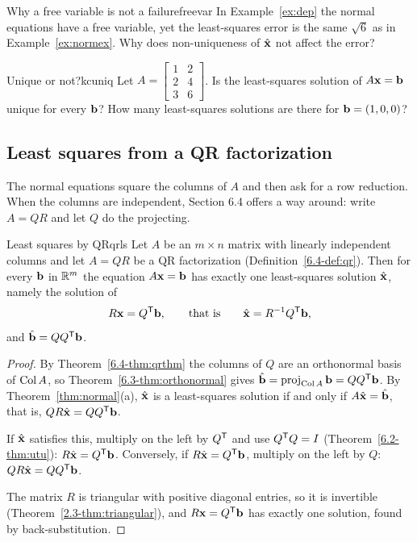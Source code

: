 \documentclass[11pt]{article}
\begin{document}
\begin{think}{Why a free variable is not a failure}{freevar}
In Example~\ref{ex:dep} the normal equations have a free variable, yet the least-squares error is the same $\sqrt6$ as in Example~\ref{ex:normex}. Why does non-uniqueness of $\hat{\mathbf{x}}$ not affect the error?
\end{think}

\begin{kc}{Unique or not?}{kcuniq}
Let $A=\begin{bmatrix}1&2\\2&4\\3&6\end{bmatrix}$. Is the least-squares solution of $A\mathbf{x}=\mathbf{b}$ unique for every $\mathbf{b}$? How many least-squares solutions are there for $\mathbf{b}=(1,0,0)$?
\end{kc}

\subsection*{Least squares from a QR factorization}

The normal equations square the columns of $A$ and then ask for a row reduction. When the columns are independent, Section 6.4 offers a way around: write $A=QR$ and let $Q$ do the projecting.

\begin{thm}{Least squares by QR}{qrls}
Let $A$ be an $m\times n$ matrix with linearly independent columns and let $A=QR$ be a QR factorization (Definition~\ref{6.4-def:qr}). Then for every $\mathbf{b}$ in $\mathbb{R}^m$ the equation $A\mathbf{x}=\mathbf{b}$ has exactly one least-squares solution $\hat{\mathbf{x}}$, namely the solution of
\[
R\mathbf{x}=Q^{\mathsf T}\mathbf{b},\qquad\text{that is}\qquad\hat{\mathbf{x}}=R^{-1}Q^{\mathsf T}\mathbf{b},
\]
and $\hat{\mathbf{b}}=QQ^{\mathsf T}\mathbf{b}$.
\end{thm}

\begin{proof}
By Theorem~\ref{6.4-thm:qrthm} the columns of $Q$ are an orthonormal basis of $\operatorname{Col} A$, so Theorem~\ref{6.3-thm:orthonormal} gives $\hat{\mathbf{b}}=\operatorname{proj}_{\operatorname{Col} A}\mathbf{b}=QQ^{\mathsf T}\mathbf{b}$. By Theorem~\ref{thm:normal}(a), $\hat{\mathbf{x}}$ is a least-squares solution if and only if $A\hat{\mathbf{x}}=\hat{\mathbf{b}}$, that is, $QR\hat{\mathbf{x}}=QQ^{\mathsf T}\mathbf{b}$.

If $\hat{\mathbf{x}}$ satisfies this, multiply on the left by $Q^{\mathsf T}$ and use $Q^{\mathsf T} Q=I$ (Theorem~\ref{6.2-thm:utu}): $R\hat{\mathbf{x}}=Q^{\mathsf T}\mathbf{b}$. Conversely, if $R\hat{\mathbf{x}}=Q^{\mathsf T}\mathbf{b}$, multiply on the left by $Q$: $QR\hat{\mathbf{x}}=QQ^{\mathsf T}\mathbf{b}$.

The matrix $R$ is triangular with positive diagonal entries, so it is invertible (Theorem~\ref{2.3-thm:triangular}), and $R\mathbf{x}=Q^{\mathsf T}\mathbf{b}$ has exactly one solution, found by back-substitution.
\end{proof}
\end{document}
